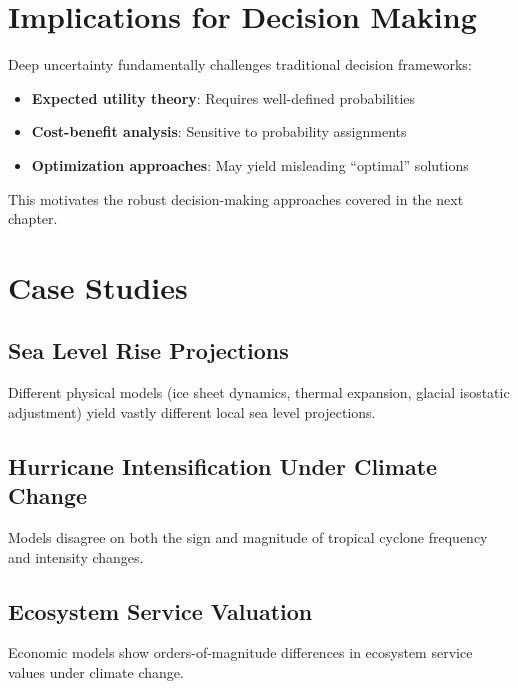 \documentclass[
  letterpaper,
  DIV=11,
  numbers=noendperiod]{scrreprt}
\providecommand{\tightlist}{%
  \setlength{\itemsep}{0pt}\setlength{\parskip}{0pt}}
\begin{document}
\section{Implications for Decision
Making}\label{implications-for-decision-making}

Deep uncertainty fundamentally challenges traditional decision
frameworks:

\begin{itemize}
\tightlist
\item
  \textbf{Expected utility theory}: Requires well-defined probabilities
\item
  \textbf{Cost-benefit analysis}: Sensitive to probability assignments
\item
  \textbf{Optimization approaches}: May yield misleading ``optimal''
  solutions
\end{itemize}

This motivates the robust decision-making approaches covered in the next
chapter.

\section{Case Studies}\label{case-studies-2}

\subsection{Sea Level Rise
Projections}\label{sea-level-rise-projections}

Different physical models (ice sheet dynamics, thermal expansion,
glacial isostatic adjustment) yield vastly different local sea level
projections.

\subsection{Hurricane Intensification Under Climate
Change}\label{hurricane-intensification-under-climate-change}

Models disagree on both the sign and magnitude of tropical cyclone
frequency and intensity changes.

\subsection{Ecosystem Service
Valuation}\label{ecosystem-service-valuation}

Economic models show orders-of-magnitude differences in ecosystem
service values under climate change.
\end{document}
